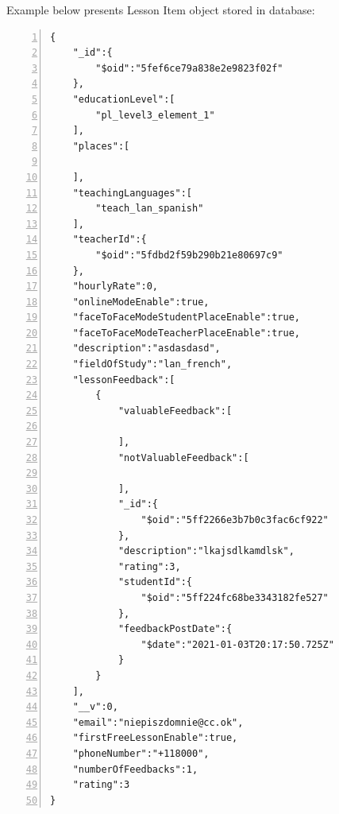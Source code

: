 Example below presents Lesson Item object stored in database:
\begin{lstlisting}[breaklines=true, numbers=left, stepnumber=1]
{
    "_id":{
        "$oid":"5fef6ce79a838e2e9823f02f"
    },
    "educationLevel":[
        "pl_level3_element_1"
    ],
    "places":[
        
    ],
    "teachingLanguages":[
        "teach_lan_spanish"
    ],
    "teacherId":{
        "$oid":"5fdbd2f59b290b21e80697c9"
    },
    "hourlyRate":0,
    "onlineModeEnable":true,
    "faceToFaceModeStudentPlaceEnable":true,
    "faceToFaceModeTeacherPlaceEnable":true,
    "description":"asdasdasd",
    "fieldOfStudy":"lan_french",
    "lessonFeedback":[
        {
            "valuableFeedback":[
                
            ],
            "notValuableFeedback":[
                
            ],
            "_id":{
                "$oid":"5ff2266e3b7b0c3fac6cf922"
            },
            "description":"lkajsdlkamdlsk",
            "rating":3,
            "studentId":{
                "$oid":"5ff224fc68be3343182fe527"
            },
            "feedbackPostDate":{
                "$date":"2021-01-03T20:17:50.725Z"
            }
        }
    ],
    "__v":0,
    "email":"niepiszdomnie@cc.ok",
    "firstFreeLessonEnable":true,
    "phoneNumber":"+118000",
    "numberOfFeedbacks":1,
    "rating":3
}
\end{lstlisting}

